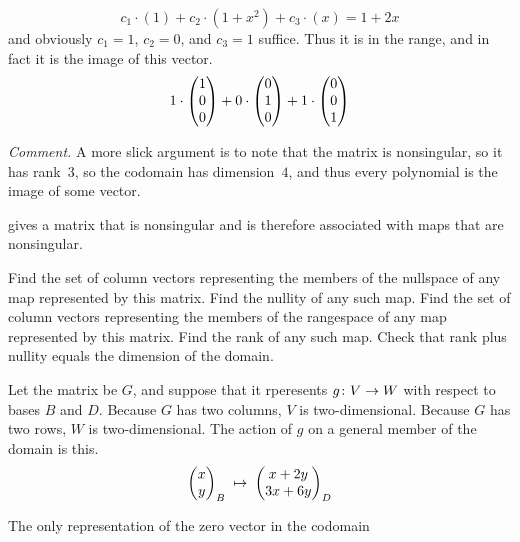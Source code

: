 \begin{exercises}
\begin{answer}
\begin{equation*}
         c_1\cdot(1)+c_2\cdot(1+x^2)+c_3\cdot(x)=1+2x
       \end{equation*}
       and obviously $c_1=1$, $c_2=0$, and $c_3=1$ suffice.
       Thus it is in the range, and in fact it is the image of
       this vector. 
       \begin{equation*}
         1\cdot\begin{pmatrix} 1 \\ 0 \\ 0 \end{pmatrix}+0\cdot\begin{pmatrix} 0 \\ 1 \\ 0 \end{pmatrix}
             +1\cdot\begin{pmatrix} 0 \\ 0 \\ 1 \end{pmatrix}
       \end{equation*}

       \textit{Comment.}
       A more slick argument is to note that the matrix is nonsingular,
       so it has rank~$3$, so the codomain has dimension~$4$,
       and thus every polynomial is the image of some vector.
     \end{answer}
  \item 
     gives a matrix that is
    nonsingular and is therefore associated with maps that are nonsingular.
    \begin{exparts}
      \partsitem Find the set of column vectors representing the members of
        the nullspace of any map represented by this matrix.
      \partsitem Find the nullity of any such map.
      \partsitem Find the set of column vectors representing the members of
        the rangespace of any map represented by this matrix.
      \partsitem Find the rank of any such map.
      \partsitem Check that rank plus nullity equals the dimension of the
        domain.
    \end{exparts}
    \begin{answer}
      Let the matrix be $G$, and suppose that it rperesents $\mbox{$g\colon V\to W$}$ 
      with respect to bases $B$ and $D$.
      Because $G$ has two columns, $V$ is two-dimensional.
      Because $G$ has two rows, $W$ is two-dimensional.
      The action of $g$ on a general member of the domain is this.
      \begin{equation*}
        \begin{pmatrix} x \\ y \end{pmatrix}_B 
         \;\mapsto\; 
        \begin{pmatrix} x+2y \\ 3x+6y \end{pmatrix}_D
      \end{equation*}
      \begin{exparts}
        \partsitem The only representation of the zero vector in the codomain

\end{exparts}
\end{answer}
\end{exercises}
